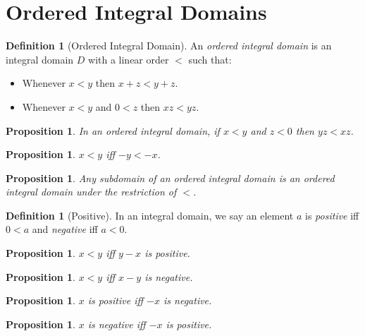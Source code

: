 \documentclass{article}
\newtheorem{proposition}[axiom]{Proposition}
\theoremstyle{definition}
\newtheorem{definition}[axiom]{Definition}
\begin{document}
    \section{Ordered Integral Domains}

    \begin{definition}[Ordered Integral Domain]
        An \emph{ordered integral domain} is an integral domain $D$ with a linear order $<$ such that:
        \begin{itemize}
            \item Whenever $x < y$ then $x + z < y + z$.
            \item Whenever $x < y$ and $0 < z$ then $xz < yz$.
        \end{itemize}
    \end{definition}

    \begin{proposition}
        In an ordered integral domain, if $x < y$ and $z < 0$ then $yz < xz$.
    \end{proposition}

    \begin{proposition}
        $x < y$ iff $-y < -x$.
    \end{proposition}

    \begin{proposition}
        Any subdomain of an ordered integral domain is an ordered integral domain under the restriction of
        $<$.
    \end{proposition}

    \begin{definition}[Positive]
        In an integral domain, we say an element $a$ is \emph{positive} iff $0 < a$ and \emph{negative}
        iff $a < 0$.
    \end{definition}

    \begin{proposition}
        $x < y$ iff $y - x$ is positive.
    \end{proposition}

    \begin{proposition}
        $x < y$ iff $x - y$ is negative.
    \end{proposition}

    \begin{proposition}
        $x$ is positive iff $-x$ is negative.
    \end{proposition}

    \begin{proposition}
        $x$ is negative iff $-x$ is positive.
    \end{proposition}
\end{document}
